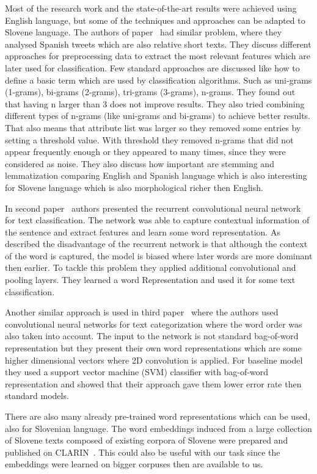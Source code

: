 \documentclass[11pt,a4paper]{article}
\begin{document}
Most of the research work and the state-of-the-art results were achieved using English language, but some of the techniques and approaches can be adapted to Slovene language.
The authors of paper~\cite{articleSpanish} had similar problem, where they analysed Spanish tweets which are also relative short texts.
They discuss different approaches for preprocessing data to extract the most relevant features which are later used for classification.
Few standard approaches are discussed like how to define a basic term which are used by classification algorithms.
Such as uni-grams (1-grams), bi-grams (2-grams), tri-grams (3-grams), n-grams.
They found out that having n larger than 3 does not improve results.
They also tried combining different types of n-grams (like uni-grams and bi-grams) to achieve better results.
That also means that attribute list was larger so they removed some entries by setting a threshold value.
With threshold they removed n-grams that did not appear frequently enough or they appeared to many times, since they were considered as noise.
They also discuss how important are stemming and lemmatization comparing English and Spanish language which is also interesting for Slovene language which is also morphological richer then English.

In second paper~\cite{article2} authors presented the recurrent convolutional neural network for text classification.
The network was able to capture contextual information of the sentence and extract features and learn some word representation.
As described the disadvantage of the recurrent network is that although the context of the word is captured, the model is biased where later words are more dominant then earlier.
To tackle this problem they applied additional convolutional and pooling layers.
They learned a word Representation and used it for some text classification.

Another similar approach is used in third paper~\cite{article3} where the authors used convolutional neural networks for text categorization where the word order was also taken into account.
The input to the network is not standard bag-of-word representation but they present their own word representations which are some higher dimensional vectors where 2D convolution is applied.
For baseline model they used a support vector machine (SVM) classifier with bag-of-word representation and showed that their approach gave them lower error rate then standard models.

There are also many already pre-trained word representations which can be used, also for Slovenian language.
The word embeddings induced from a large collection of Slovene texts composed of existing corpora of Slovene were prepared and published on CLARIN~\cite{embeddings}.
This could also be useful with our task since the embeddings were learned on bigger corpuses then are available to us.
\end{document}
